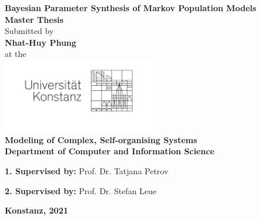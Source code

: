 \begin{titlepage}
  \begin{center}
    {\LARGE \textbf{Bayesian Parameter Synthesis of Markov Population Models}}
    \\[1cm]
    {\Large \textbf{Master Thesis}}
    \\[1cm]
    {\Large Submitted by}
    \\[0.5cm]
    {\LARGE \textbf{Nhat-Huy Phung}}
    \\[0.5cm]
    {\Large at the}
    \\[0.5cm]
    \includegraphics[width=0.5\textwidth]{figures/unisignet-klein.jpg}
    \\[1cm]
    {\large \textbf{Modeling of Complex, Self-organising Systems}}
    \\[1cm]
    {\large \textbf{Department of Computer and Information Science}}
    \\[2cm]
    \begin{minipage}[c]{\textwidth}
      \begin{description}[style=multiline]
        \item {\large \textbf{1. Supervised by:} Prof. Dr. Tatjana Petrov }
        \item {\large \textbf{2. Supervised by:} Prof. Dr. Stefan Leue }
      \end{description}
    \end{minipage}
    \vfill
    {\LARGE \textbf{Konstanz, 2021}}
  \end{center}
\end{titlepage}